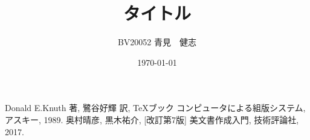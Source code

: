 \documentclass[titlepage, a4paper, 11pt, dvipdfmx]{jsarticle}
\title{\Huge タイトル}
\date{\today}
\author{\Large BV20052 \quad 青見　健志}
\begin{document}
\maketitle
{}
\tableofcontents
\newpage
{}



\begin{thebibliography}{1}
     Donald E.Knuth 著, 鷺谷好輝 訳, \TeX ブック コンピュータによる組版システム, アスキー, 1989.
     奥村晴彦, 黒木祐介, [改訂第7版] \LaTeXe 美文書作成入門, 技術評論社, 2017.
\end{thebibliography}
\end{document}
